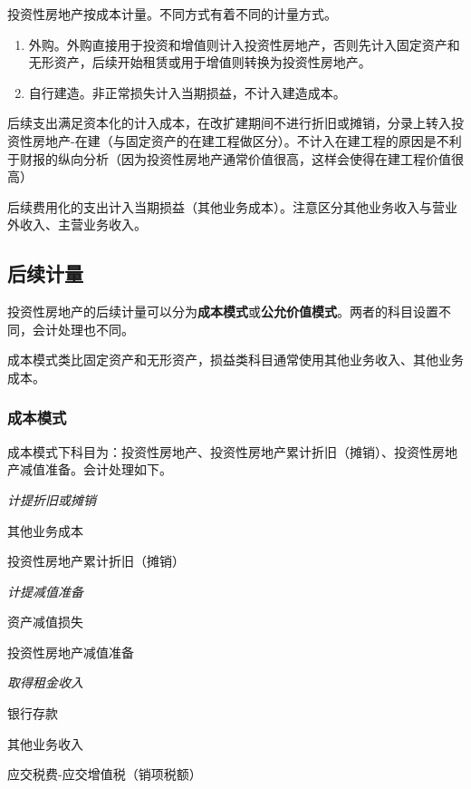 \documentclass[UTF8,12pt]{ctexart}
\newenvironment{Dr}{%
	\begin{list}{}%
		{
			\setlength{\leftmargin}{2em}
			\setlength{\labelwidth}{2em}
			\setlength{\labelsep}{0pt}
			\setlength{\itemindent}{0pt}
			\setlength{\listparindent}{0pt}
			\setlength{\parsep}{0pt}
			\setlength{\topsep}{0pt}
		}
		\item[\textbf{借：}]
	}{%
	\end{list}
}
\newenvironment{Cr}{%
	\begin{list}{}%
		{
			\setlength{\leftmargin}{3em}
			\setlength{\labelwidth}{2em}
			\setlength{\labelsep}{0pt}
			\setlength{\itemindent}{0pt}
			\setlength{\listparindent}{0pt}
			\setlength{\parsep}{0pt}
			\setlength{\topsep}{0pt}
		}
		\item[\textbf{贷：}]
	}{%
	\end{list}
}
\numberwithin{equation}{section} %
\numberwithin{figure}{section}
\numberwithin{table}{section}
\begin{document}
	
	投资性房地产按成本计量。不同方式有着不同的计量方式。
	
	\begin{enumerate}
		\item 外购。外购直接用于投资和增值则计入投资性房地产，否则先计入固定资产和无形资产，后续开始租赁或用于增值则转换为投资性房地产。
		
		\item 自行建造。非正常损失计入当期损益，不计入建造成本。
	\end{enumerate}
	
	后续支出满足资本化的计入成本，在改扩建期间不进行折旧或摊销，分录上转入投资性房地产-在建（与固定资产的在建工程做区分）。不计入在建工程的原因是不利于财报的纵向分析（因为投资性房地产通常价值很高，这样会使得在建工程价值很高）
	
	后续费用化的支出计入当期损益（其他业务成本）。注意区分其他业务收入与营业外收入、主营业务收入。
	
	\subsection{后续计量}
	投资性房地产的后续计量可以分为\textbf{成本模式}或\textbf{公允价值模式}。两者的科目设置不同，会计处理也不同。
	
	成本模式类比固定资产和无形资产，损益类科目通常使用其他业务收入、其他业务成本。
	
	\subsubsection{成本模式}
	成本模式下科目为：投资性房地产、投资性房地产累计折旧（摊销）、投资性房地产减值准备。会计处理如下。
	
	\textit{计提折旧或摊销}
	
	\begin{Dr}
		其他业务成本
	\end{Dr}
	\begin{Cr}
		投资性房地产累计折旧（摊销）
	\end{Cr}
	
	\textit{计提减值准备}
	
	\begin{Dr}
		资产减值损失
	\end{Dr}
	\begin{Cr}
		投资性房地产减值准备
	\end{Cr}

	
	\textit{取得租金收入}
	
	\begin{Dr}
		银行存款
	\end{Dr}
	\begin{Cr}
		其他业务收入
		
		应交税费-应交增值税（销项税额）
	\end{Cr}
	
\end{document}
